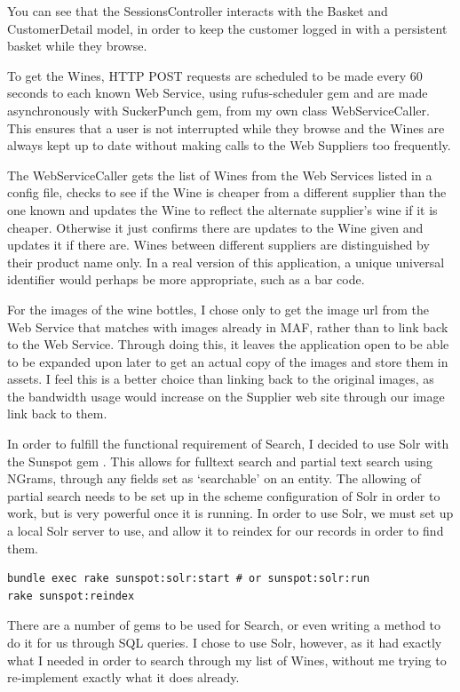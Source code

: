 \documentclass[12pt]{article}
\begin{document}
You can see that the SessionsController interacts with the Basket and CustomerDetail model, in order to keep the customer logged in with a persistent basket while they browse.

To get the Wines, HTTP POST requests are scheduled to be made every 60 seconds to each known Web Service, using rufus-scheduler gem\cite{rufus} and are made asynchronously with SuckerPunch gem\cite{suckerpunch}, from my own class WebServiceCaller. This ensures that a user is not interrupted while they browse and the Wines are always kept up to date without making calls to the Web Suppliers too frequently. 

The WebServiceCaller gets the list of Wines from the Web Services listed in a config file, checks to see if the Wine is cheaper from a different supplier than the one known and updates the Wine to reflect the alternate supplier's wine if it is cheaper. Otherwise it just confirms there are updates to the Wine given and updates it if there are. Wines between different suppliers are distinguished by their product name only. In a real version of this application, a unique universal identifier would perhaps be more appropriate, such as a bar code.

For the images of the wine bottles, I chose only to get the image url from the Web Service that matches with images already in MAF, rather than to link back to the Web Service. Through doing this, it leaves the application open to be able to be expanded upon later to get an actual copy of the images and store them in assets. I feel this is a better choice than linking back to the original images, as the bandwidth usage would increase on the Supplier web site through our image link back to them.

In order to fulfill the functional requirement of Search, I decided to use Solr with the Sunspot gem \cite{solrsunspot}. This allows for fulltext search and partial text search using NGrams, through any fields set as `searchable' on an entity. The allowing of partial search needs to be set up in the scheme configuration of Solr in order to work, but is very powerful once it is running. In order to use Solr, we must set up a local Solr server to use, and allow it to reindex for our records in order to find them.
\begin{lstlisting}
bundle exec rake sunspot:solr:start # or sunspot:solr:run
rake sunspot:reindex
\end{lstlisting}
There are a number of gems to be used for Search, or even writing a method to do it for us through SQL queries. I chose to use Solr, however, as it had exactly what I needed in order to search through my list of Wines, without me trying to re-implement exactly what it does already.
\end{document}
